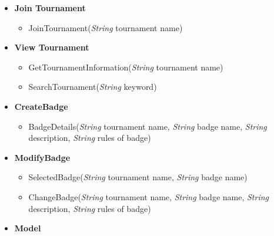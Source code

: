 \begin{itemize}
    \item \textbf{\textbf{Join Tournament}}
\begin{itemize}
        \item JoinTournament(\textit{String} tournament name)
\end{itemize}

    \item \textbf{\textbf{View Tournament}}

\begin{itemize}
        \item GetTournamentInformation(\textit{String} tournament name)
        \item SearchTournament(\textit{String} keyword)
\end{itemize}

    \item \textbf{\textbf{CreateBadge}}
\begin{itemize}

    \item BadgeDetails(\textit{String} tournament name, \textit{String} badge name, \textit{String} description, \textit{String} rules of badge)
\end{itemize}

    \item \textbf{\textbf{ModifyBadge}}

\begin{itemize}
        \item SelectedBadge(\textit{String} tournament name, \textit{String} badge name)
        \item ChangeBadge(\textit{String} tournament name, \textit{String} badge name, \textit{String} description, \textit{String} rules of badge)
\end{itemize}

    \item \textbf{\textbf{Model}}


\end{itemize}
